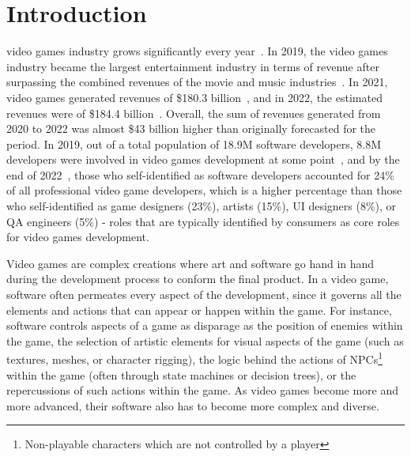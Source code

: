 \section{Introduction}

 video games industry grows significantly every year~\cite{rykala2020growth}. In 2019, the video games industry became the largest entertainment industry in terms of revenue after surpassing the combined revenues of the movie and music industries~\cite{politowski2021game}. In 2021, video games generated revenues of \$180.3 billion~\cite{wijman2021games}, and in 2022, the estimated revenues were of \$184.4 billion~\cite{wijman2022games}. Overall, the sum of revenues generated from 2020 to 2022 was almost \$43 billion higher than originally forecasted for the period. In 2019, out of a total population of 18.9M software developers, 8.8M developers were involved in video games development at some point~\cite{devData}, and by the end of 2022~\cite{devNation}, those who self-identified as software developers accounted for 24\% of all professional video game developers, which is a higher percentage than those who self-identified as game designers (23\%), artists (15\%), UI designers (8\%), or QA engineers (5\%) - roles that are typically identified by consumers as core roles for video games development.

Video games are complex creations where art and software go hand in hand during the development process to conform the final product. In a video game, software often permeates every aspect of the development, since it governs all the elements and actions that can appear or happen within the game. For instance, software controls aspects of a game as disparage as the position of enemies within the game, the selection of artistic elements for visual aspects of the game (such as textures, meshes, or character rigging), the logic behind the actions of NPCs\footnote{Non-playable characters which are not controlled by a player} within the game (often through state machines or decision trees), or the repercussions of such actions within the game. As video games become more and more advanced, their software also has to become more complex and diverse.

